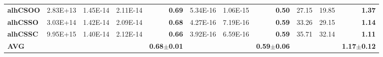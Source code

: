 \documentclass[encoding=utf8,british]{tumphthesis}
\begin{document}
\begin{table}[H]
\begin{subtable}{1\textwidth}
{\begin{tabular}{|l|r|rrr|rrr|rrr|}
\rowcolor[HTML]{CFE2F3} 
\textbf{alhCSOO} & 2.83E+13                                     & 1.45E-14                                           & 2.11E-14                                            & \textbf{0.69}                                    & 5.34E-16                                           & 1.06E-15                                            & \textbf{0.50}                                    & 27.15                                              & 19.85                                               & \textbf{1.37}                                    \\
\textbf{alhCSSO} & 3.03E+14                                     & 1.42E-14                                           & 2.09E-14                                            & \textbf{0.68}                                    & 4.27E-16                                           & 7.19E-16                                            & \textbf{0.59}                                    & 33.26                                              & 29.15                                               & \textbf{1.14}                                    \\
\rowcolor[HTML]{CFE2F3} 
\textbf{alhCSSC} & 9.95E+15                                     & 1.40E-14                                           & 2.12E-14                                            & \textbf{0.66}                                    & 3.92E-16                                           & 6.59E-16                                            & \textbf{0.59}                                    & 35.71                                              & 32.14                                               & \textbf{1.11}                                  \\ \hline
\textbf{AVG}                             &                                                      &                                                       &                            & \textbf{0.68$\pm$0.01}                                                     &                                                       &                            &   \textbf{0.59$\pm$0.06}                                                   &                                                       &  & \textbf{1.17$\pm$0.12}                          \\ \hline
\end{tabular}}
\end{subtable}

\end{table}
\endgroup
\end{document}
